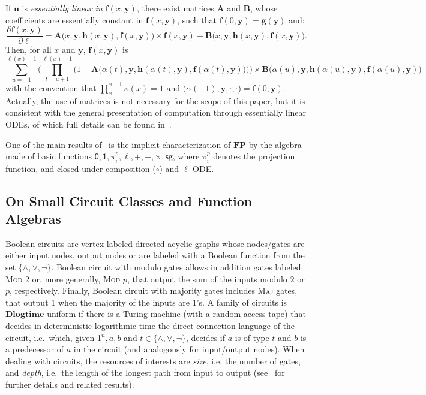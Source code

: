 \documentclass[11pt, oneside]{article}
\newcommand{\fun}[1]{\mathsf{#1}}
\newcommand{\FP}{\mathbf{FP}}
\newcommand{\tu}[1]{\mathbf{#1}}
\theoremstyle{definition}
\begin{document}
\noindent 
If $\tu u$ is \emph{essentially linear in $\tu f(x, \tu y)$}, there exist matrices $\tu A$ and $\tu B$, whose coefficients are essentially constant in $\tu f(x, \tu y)$, such that $\tu f(0, \tu y)=\tu g(\tu y)$ and:
$$
\frac{\partial \tu f(x, \tu y)}{\partial \ell} = 
\tu A\big(x,\tu y, \tu h(x, \tu y),\tu f(x, \tu y)\big) \times \tu f(x, \tu y) + \tu B\big(x, \tu y, \tu h(x, \tu y), \tu f(x, \tu y)\big).
$$
Then, for all $x$ and $\tu y$, $\tu f(x, \tu y)$ is
$$
\sum^{\ell(x)-1}_{u=-1} \Bigg(\prod^{\ell(x)-1}_{t=u+1} \bigg(1+ \tu A\Big(\alpha(t), \tu y, \tu h(\alpha(t), \tu y), \tu f(\alpha(t), \tu y)\Big)\bigg) \Bigg) \times \tu B\big(\alpha(u), \tu y, \tu h(\alpha(u), \tu y), \tu f(\alpha (u), \tu y)\big)
$$
with the convention that $\prod^{x-1}_x\kappa(x)=1$ and $\tu (\alpha(-1), \tu y, \cdot, \cdot )=\tu f(0, \tu y)$.
%
Actually, the use of matrices is not necessary for the scope of this paper, but it is consistent with the general presentation of computation through essentially linear ODEs, of which full details can be found in~\cite{BournezDurand19,BournezDurand23}.




One of the main results of~\cite{BournezDurand19} is the implicit characterization of $\FP$ by the algebra made of basic functions $\fun{0}, \fun{1}, \pi^p_i, \ell, +, -, \times, \fun{sg}$, where $\pi^p_i$ denotes the projection function, and closed under composition ($\circ$) and $\ell$-ODE.













\subsection{On Small Circuit Classes and Function Algebras}

Boolean circuits are vertex-labeled directed acyclic graphs whose nodes/gates are either input nodes, %
output nodes
or are labeled with a Boolean function from the set $\{\wedge, \vee, \neg\}$.
%
Boolean circuit with modulo gates allows in addition gates labeled \textsc{Mod 2} or, more generally, 
\textsc{Mod $p$}, that output the sum of the inputs modulo $2$ or $p$, respectively.
%
Finally, Boolean circuit with majority gates includes \textsc{Maj} gates, that output 1 when the majority of the inputs are 1's. 
%
A family of circuits %
is $\mathbf{Dlogtime}$-uniform if there is a Turing machine (with a random access tape) that decides in deterministic logarithmic time the direct connection language of the circuit, i.e.~which, given 1$^n, a,b$ and $t\in \{\wedge, \vee, \neg\}$, decides if $a$ is of type $t$ and $b$ is a predecessor of $a$ in the circuit (and analogously for input/output nodes).
%
When dealing with circuits, the resources of interests are \emph{size}, i.e. the number of gates, and \emph{depth}, i.e.~the length of the longest path from input to output (see~\cite{Vollmer} for further details and related results).
\end{document}
